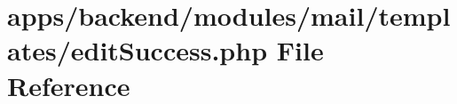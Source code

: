 \hypertarget{backend_2modules_2mail_2templates_2edit_success_8php}{\section{apps/backend/modules/mail/templates/edit\-Success.php File Reference}
\label{backend_2modules_2mail_2templates_2edit_success_8php}
}

